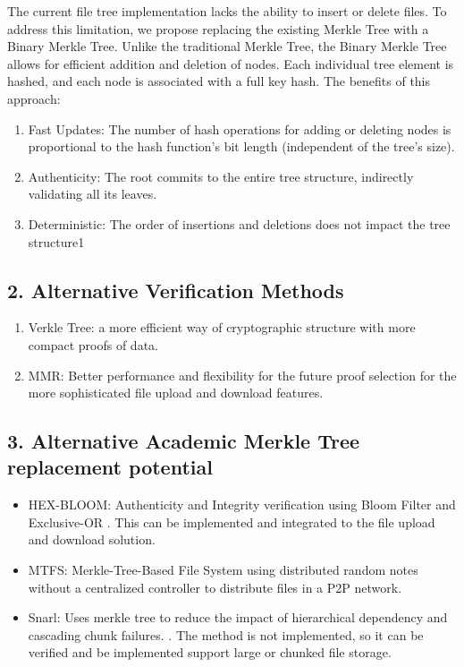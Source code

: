 \documentclass[journal]{IEEEtran}
\begin{document}
The current file tree implementation lacks the ability to insert or delete files. To address this limitation, we propose 
replacing the existing Merkle Tree with a Binary Merkle Tree. Unlike the traditional Merkle Tree, the Binary Merkle Tree 
allows for efficient addition and deletion of nodes. Each individual tree element is hashed, and each node is associated 
with a full key hash. The benefits of this approach:
\begin{enumerate}
  \item Fast Updates: The number of hash operations for adding or deleting nodes is proportional to the hash function’s bit length (independent of the tree’s size).
  \item Authenticity: The root commits to the entire tree structure, indirectly validating all its leaves.
  \item Deterministic: The order of insertions and deletions does not impact the tree structure1
\end{enumerate}

\subsection*{2. Alternative Verification Methods}
\begin{enumerate}
  \item Verkle Tree: a more efficient way of cryptographic structure with more compact proofs of data. 
  \item MMR: Better performance and flexibility for the future proof selection for the more sophisticated file upload and download features.
\end{enumerate}

\subsection*{3. Alternative Academic Merkle Tree replacement potential}
\begin{itemize}
  \item HEX-BLOOM: Authenticity and Integrity verification using Bloom Filter and Exclusive-OR \cite{cryptoeprint:2021/773}. This can be implemented and integrated to the file upload and download solution.
  \item MTFS: Merkle-Tree-Based File System using distributed random notes without a centralized controller to distribute files in a P2P network. \cite{8751389} 
  \item Snarl: Uses merkle tree to reduce the impact of hierarchical dependency and cascading chunk failures. \cite{10.1145/3464298.3493397}. The method is not implemented, so it can be verified and be implemented support large or chunked file storage.
\end{itemize}
\end{document}
